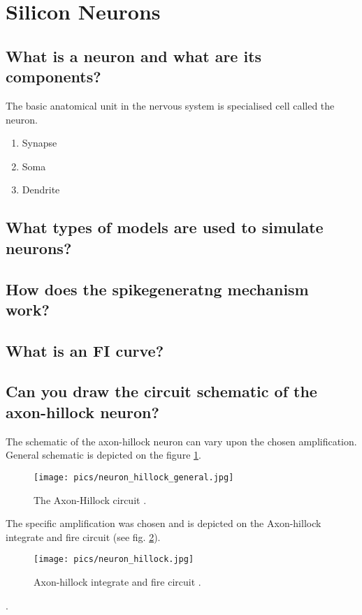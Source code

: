 \documentclass[main]{subfiles}
\begin{document}

\section{Silicon Neurons}
\subsection{What is a neuron and what are its components?}
The basic anatomical unit in the nervous system is specialised cell called the neuron.

\cite{book:Mead}

\begin{enumerate}
\item Synapse
\item Soma
\item Dendrite
\end{enumerate}
\subsection{What types of models are used to simulate neurons?}
\subsection{How does the spikegeneratng mechanism work?}
\subsection{What is an FI curve?}
\subsection{Can you draw the circuit schematic of the axon-hillock neuron?}
The schematic of the axon-hillock neuron can vary upon the chosen amplification. General schematic is depicted on the figure \ref{fig:neuron_hillock_general}.

\begin{figure}[htbp]
  \centering
  \texttt{[image: pics/neuron\_hillock\_general.jpg]}
  \caption{The Axon-Hillock circuit \cite{lec11}.}
  \label{fig:neuron_hillock_general}
\end{figure} 

The specific amplification was chosen and is depicted on the Axon-hillock integrate and fire circuit (see fig. \ref{fig:neuron_hillock}).

\begin{figure}[htbp]
  \centering
  \texttt{[image: pics/neuron\_hillock.jpg]}
  \caption{Axon-hillock integrate and fire circuit \cite{lab11}.}
  \label{fig:neuron_hillock}
\end{figure} 


\cite{lab11}.
\end{document}
